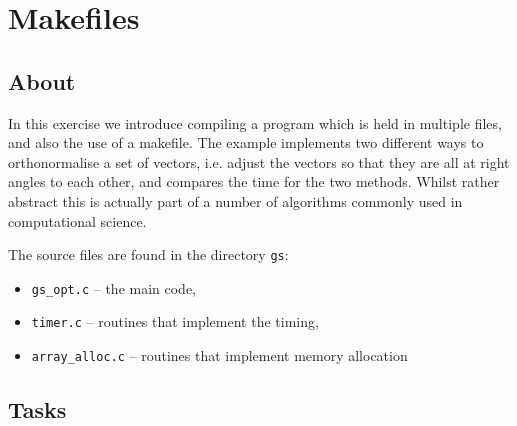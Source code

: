 \documentclass[a4paper, 12pt]{article}
\def \cc   {\tt }               %
\begin{document}
\section{Makefiles}
\label{integral}


\subsection*{About}

In this exercise we introduce compiling a program which is held in multiple files, and also the
use of a makefile. The example implements two different ways to orthonormalise a set of vectors,
i.e. adjust the vectors so that they are all at right angles to each other, and compares the time
for the two methods. Whilst rather abstract this is actually part of a number of algorithms commonly
used in computational science.

The source files are found in the directory {\cc gs}:
%
\begin{itemize}
  \item {\cc gs\_opt.c} -- the main code,
  \item {\cc timer.c} -- routines that implement the timing,
  \item {\cc array\_alloc.c} -- routines that implement memory allocation
\end{itemize}
%

\subsection*{Tasks}
\end{document}
